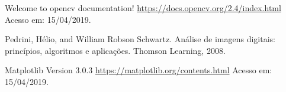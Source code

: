 \documentclass[twoside,twocolumn]{article}
\begin{document}
\begin{thebibliography}{99} %

 Welcome to opencv documentation! \href{https://docs.opencv.org/2.4/index.html}{https://docs.opencv.org/2.4/index.html} Acesso em: 15/04/2019.

 Pedrini, Hélio, and William Robson Schwartz. Análise de imagens digitais: princípios, algoritmos e aplicações. Thomson Learning, 2008.

 Matplotlib Version 3.0.3 \href{https://matplotlib.org/contents.html}{https://matplotlib.org/contents.html} Acesso em: 15/04/2019.
 
\end{thebibliography}

\end{document}
